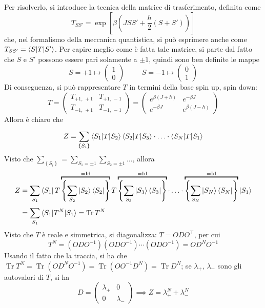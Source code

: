 \documentclass[11pt, a4paper]{scrartcl}
\theoremstyle{style}
\theoremstyle{style1}
\numberwithin{equation}{subsection}
\begin{document}
Per risolverlo, si introduce la tecnica della matrice di trasferimento, definita come
\[
T_{SS'}  = \exp\left[ \beta  \left( J S S' + \frac{h}{2}(S+S') \right) \right] 
\] 
che, nel formalismo della meccanica quantistica, si pu\`o esprimere anche come $T_{SS'} = \braket{S|T|S'} $.
Per capire meglio come \`e fatta tale matrice, si parte dal fatto che $S$ e $S'$ possono essere pari solamente a $\pm 1$, quindi sono ben definite le mappe
\[
S = +1 \longmapsto \begin{pmatrix} 1\\0 \end{pmatrix} \hspace{1cm}S = - 1 \longmapsto \begin{pmatrix} 0 \\ 1 \end{pmatrix} 
\] 
Di conseguenza, si pu\`o rappresentare $T$ in termini della base spin up, spin down:
\[
	T = \begin{pmatrix} T_{+1,\,+1}  & T_{+1,\, -1} \\ T_{-1,\, +1} & T_{-1,\, -1} \end{pmatrix}  = \begin{pmatrix} e^{\beta (J+h)} & e^{-\beta J} \\ e^{-\beta J} & e ^{\beta (J-h)}\end{pmatrix} 
\] 
Allora \`e chiaro che 
\[
Z = \sum_{\left\{ S_i \right\} }^{} \braket{S_1|T|S_2}  \braket{S_2|T|S_3} \cdot  \ldots \cdot \braket{S_N|T|S_1}  
\] 
Visto che $\sum_{\left\{ S_i \right\} }^{} = \sum_{S_1=\pm 1}^{} \sum_{S_2=\pm 1}^{} \ldots $, allora 
\[
	\begin{split}
		Z &= \sum_{S_1}^{} \bra{S_1} T \overbracket{\left\{ \sum_{S_2}^{} \ket{S_2} \bra{S_2}  \right\}}^{= \operatorname{Id} }  T \overbracket{\left\{ \sum_{S_3}^{} \ket{S_3} \bra{S_3}  \right\}}^{=\operatorname{Id} }  \cdot  \ldots \cdot \overbracket{\left\{ \sum_{S_N}^{} \ket{S_N} \bra{S_N}  \right\}}^{= \operatorname{Id} }  \ket{S_1} \\
		  & = \sum_{S_1}^{} \braket{S_1|T^N|S_1} = \operatorname{Tr} T^N
	\end{split}
\] 
Visto che $T$ \`e reale e simmetrica, si diagonalizza: $T = ODO^\top$, per cui
\[
T^N = (ODO^{-1}) (ODO^{-1}) \cdots (ODO^{-1}) = OD^NO^{-1}
\] 
Usando il fatto che la traccia, si ha che $\operatorname{Tr}  T^N = \operatorname{Tr} (OD^N O^{-1}) = \operatorname{Tr} (O O ^{-1}D^N) = \operatorname{Tr} D^N$; se $\lambda _+,\, \lambda _-$ sono gli autovalori di $T$, si ha 
\[
	D = \begin{pmatrix} \lambda _+ & 0 \\ 0 & \lambda _- \end{pmatrix} \implies Z = \lambda _+^N + \lambda _-^N 
\] 
\end{document}
